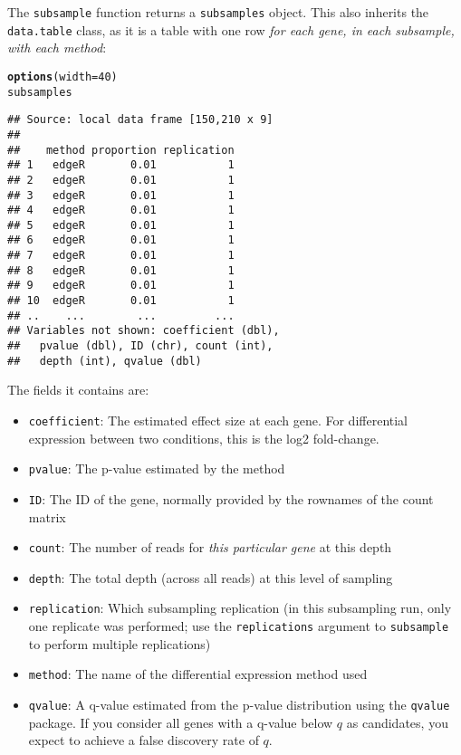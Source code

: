 \documentclass{article}\usepackage[]{graphicx}\usepackage[]{color}
\makeatletter
\newcommand{\hlnum}[1]{\textcolor[rgb]{0.686,0.059,0.569}{#1}}%
\newcommand{\hlstd}[1]{\textcolor[rgb]{0.345,0.345,0.345}{#1}}%
\newcommand{\hlkwc}[1]{\textcolor[rgb]{0.333,0.667,0.333}{#1}}%
\newcommand{\hlkwd}[1]{\textcolor[rgb]{0.737,0.353,0.396}{\textbf{#1}}}%
\newenvironment{kframe}{%
 \def\at@end@of@kframe{}%
 \ifinner\ifhmode%
  \def\at@end@of@kframe{\end{minipage}}%
  \begin{minipage}{\columnwidth}%
 \fi\fi%
 \def\FrameCommand##1{\hskip\@totalleftmargin \hskip-\fboxsep
 \colorbox{shadecolor}{##1}\hskip-\fboxsep
     \hskip-\linewidth \hskip-\@totalleftmargin \hskip\columnwidth}%
 \MakeFramed {\advance\hsize-\width
   \@totalleftmargin\z@ \linewidth\hsize
   \@setminipage}}%
 {\par\unskip\endMakeFramed%
 \at@end@of@kframe}
\newenvironment{knitrout}{}{} %
\makeatother
\begin{document}
The \texttt{subsample} function returns a \texttt{subsamples} object. This also inherits the \texttt{data.table} class, as it is a table with one row \emph{for each gene, in each subsample, with each method}:

\begin{knitrout}
\color{fgcolor}\begin{kframe}
\begin{alltt}
\hlkwd{options}\hlstd{(}\hlkwc{width} \hlstd{=} \hlnum{40}\hlstd{)}
\hlstd{subsamples}
\end{alltt}
\begin{verbatim}
## Source: local data frame [150,210 x 9]
## 
##    method proportion replication
## 1   edgeR       0.01           1
## 2   edgeR       0.01           1
## 3   edgeR       0.01           1
## 4   edgeR       0.01           1
## 5   edgeR       0.01           1
## 6   edgeR       0.01           1
## 7   edgeR       0.01           1
## 8   edgeR       0.01           1
## 9   edgeR       0.01           1
## 10  edgeR       0.01           1
## ..    ...        ...         ...
## Variables not shown: coefficient (dbl),
##   pvalue (dbl), ID (chr), count (int),
##   depth (int), qvalue (dbl)
\end{verbatim}
\end{kframe}
\end{knitrout}

The fields it contains are:

\begin{itemize}
\item \texttt{coefficient}: The estimated effect size at each gene. For differential expression between two conditions, this is the log2 fold-change.
\item \texttt{pvalue}: The p-value estimated by the method
\item \texttt{ID}: The ID of the gene, normally provided by the rownames of the count matrix
\item \texttt{count}: The number of reads for \emph{this particular gene} at this depth
\item \texttt{depth}: The total depth (across all reads) at this level of sampling
\item \texttt{replication}: Which subsampling replication (in this subsampling run, only one replicate was performed; use the \texttt{replications} argument to \texttt{subsample} to perform multiple replications)
\item \texttt{method}: The name of the differential expression method used
\item \texttt{qvalue}: A q-value estimated from the p-value distribution using the \texttt{qvalue} package. If you consider all genes with a q-value below $q$ as candidates, you expect to achieve a false discovery rate of $q$.
\end{itemize}
\end{document}
